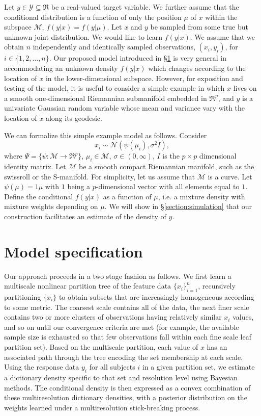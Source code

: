\documentclass{article} %
\providecommand{\mc}[1]{\mathcal{#1}}
\newcommand{\from}{{\ensuremath{\colon}}}           %
\begin{document}
Let $y \in  \mathcal{Y} \subseteq \Re$ be a real-valued target variable. We further assume that the conditional distribution is a function of only the position $\mu$ of $x$ within the subspace $\mathcal{M}$, $f(y|x)=f(y|\mu)$. Let $x$ and $y$ be sampled from some true but unknown joint distribution. We would like to learn $f(y| x)$.  We assume that we obtain $n$ independently and identically sampled observations, $(x_i,y_i) $, for $i \in \{1,2,\ldots,n\}$.  Our proposed model introduced in \S \ref{section:model} is very general in accommodating an unknown density $f(y|x)$ which changes according to the location of $x$ in the lower-dimensional subspace.  However, for exposition and testing of the model, it is useful to consider a simple example in which $x$ lives on a smooth one-dimensional Riemannian submanifold embedded in $\Re^p$, and  $y$ is a univariate Gaussian random variable whose mean and variance vary with the location of $x$ along its geodesic.  

We can formalize this simple example model as follows. Consider  $$x_i \sim \mc{N}(\psi(\mu_i),\sigma^2 I),$$ where $\Psi =\{ \psi \from \mc{M} \to \Re^p\}$, $\mu_i \in \mc{M}$, $\sigma \in (0,\infty)$, $I$ is the $p\times p$ dimensional identity matrix.  Let $\mc{M}$ be a smooth compact Riemannian manifold, such as the swissroll or the S-manifold. For simplicity, let us assume that $\mc{M}$ is a curve. Let $\psi(\mu)= 1\mu$ with $1$ being a $p$-dimensional vector with all elements equal to $1$. Define the conditional $f(y|x)$ as a function of $\mu$, i.e. a mixture density with mixture weights depending on $\mu$.  We will show in \S \ref{section:simulation} that  our construction facilitates an estimate of the density of $y$.


\section{Model specification} \label{section:model}

Our approach proceeds in a two stage fashion as follows. We first learn a multiscale nonlinear partition tree of the feature data $\{ x_i \}_{i=1}^n$, recursively partitioning $\{x_i \}$ to obtain subsets that are increasingly homogeneous according to some metric.  The coarsest scale contains all of the data, the next finer scale contains two or more clusters of observations having relatively similar $x_i$ values, and so on  until our convergence criteria are met (for example, the available sample size is exhausted so that few observations fall within each fine scale leaf partition set).  Based on the multiscale partition, each value of $x$ has an associated path through the tree encoding the set membership at each scale.  Using the response data $y_i$ for all subjects $i$ in a given partition set, we estimate a dictionary density specific to that set and resolution level using Bayesian methods.  The conditional density is then expressed as a convex combination of these multiresolution dictionary densities, with a posterior distribution on the weights learned under a multiresolution stick-breaking process.
\end{document}

